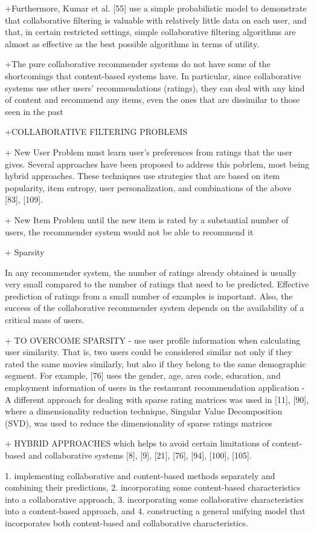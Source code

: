 +Furthermore, Kumar et al. [55] use a simple
probabilistic model to demonstrate that collaborative filtering
is valuable with relatively little data on each user, and
that, in certain restricted settings, simple collaborative
filtering algorithms are almost as effective as the best
possible algorithms in terms of utility.

+The pure collaborative recommender systems do not
have some of the shortcomings that content-based systems
have. In particular, since collaborative systems use other
users’ recommendations (ratings), they can deal with any
kind of content and recommend any items, even the ones
that are dissimilar to those seen in the past

+COLLABORATIVE FILTERING PROBLEMS

 + New User Problem
    must learn user's preferences from ratings that the user gives. 
    Several approaches have been proposed to address this pobrlem, most being hybrid approaches. These techniques use strategies that     are based on item popularity, item entropy, user personalization, and
    combinations of the above [83], [109].
    
 + New Item Problem
until the new item is
rated by a substantial number of users, the recommender
system would not be able to recommend it

+ Sparsity

In any recommender system, the number of ratings already
obtained is usually very small compared to the number of
ratings that need to be predicted. Effective prediction of
ratings from a small number of examples is important. Also,
the success of the collaborative recommender system
depends on the availability of a critical mass of users. 

+ TO OVERCOME SPARSITY
- use user profile information when calculating user similarity. That is, two users could be considered similar not only if
they rated the same movies similarly, but also if they belong to the same demographic segment. For example, [76] uses the gender, age, area code, education, and employment
information of users in the restaurant recommendation
application
- A different
approach for dealing with sparse rating matrices was used
in [11], [90], where a dimensionality reduction technique,
Singular Value Decomposition (SVD), was used to reduce
the dimensionality of sparse ratings matrices


+ HYBRID APPROACHES
which
helps to avoid certain limitations of content-based and
collaborative systems [8], [9], [21], [76], [94], [100], [105].

1. implementing collaborative and content-based
methods separately and combining their predictions,
2. incorporating some content-based characteristics
into a collaborative approach,
3. incorporating some collaborative characteristics into
a content-based approach, and
4. constructing a general unifying model that incorporates
both content-based and collaborative
characteristics.